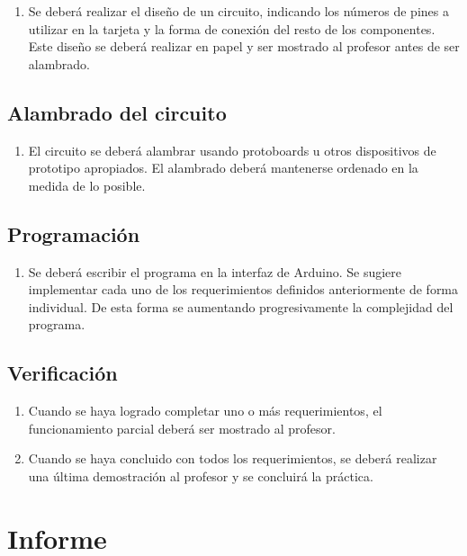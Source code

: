 \documentclass[12pt,letterpaper]{IEEEtran}
\begin{document}
\begin{enumerate}
	\item Se deberá realizar el diseño de un circuito, indicando los números de pines a utilizar en la tarjeta y la forma de conexión del resto de los componentes. Este diseño se deberá realizar en papel y ser mostrado al profesor antes de ser alambrado.

\end{enumerate}

\subsection{Alambrado del circuito}

\begin{enumerate}[resume]
	\item El circuito se deberá alambrar usando protoboards u otros dispositivos de prototipo apropiados. El alambrado deberá mantenerse ordenado en la medida de lo posible.
\end{enumerate}

\subsection{Programación}

\begin{enumerate}[resume]
	\item Se deberá escribir el programa en la interfaz de Arduino. Se sugiere implementar cada uno de los requerimientos definidos anteriormente de forma individual. De esta forma se aumentando progresivamente la complejidad del programa.
\end{enumerate}

\subsection{Verificación}

\begin{enumerate}[resume]
	\item Cuando se haya logrado completar uno o más requerimientos, el funcionamiento parcial deberá ser mostrado al profesor.
	\item Cuando se haya concluido con todos los requerimientos, se deberá realizar una última demostración al profesor y se concluirá la práctica.
\end{enumerate}


\section{Informe}
\end{document}
